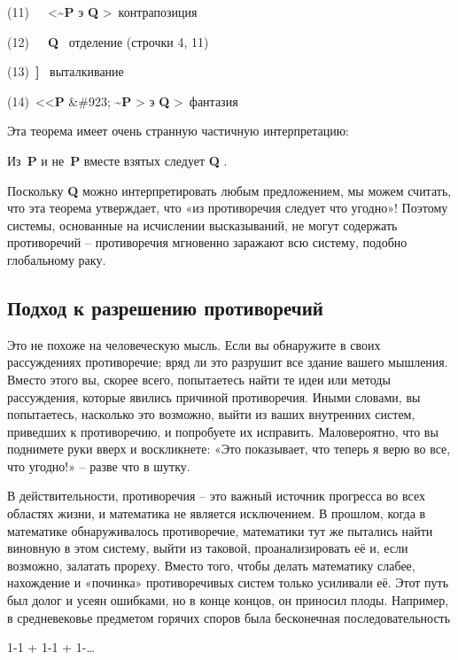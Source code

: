 \documentclass[../main.tex]{subfiles}
\begin{document}
(11)~~~\textless{}\textbf{\textasciitilde P} э \textbf{Q} \textgreater~контрапозиция

(12)~~~\textbf{Q} ~отделение (строчки 4, 11)

(13)~\textbf{{]}} ~выталкивание

(14)~\textless\textless{}\textbf{P} \&\#923; \textbf{\textasciitilde P} \textgreater{} э \textbf{Q} \textgreater~фантазия

Эта теорема имеет очень странную частичную интерпретацию:

Из~\textbf{P} и не~\textbf{P} вместе взятых следует \textbf{Q} .

Поскольку \textbf{Q} можно интерпретировать любым предложением, мы можем считать, что эта теорема утверждает, что «из противоречия следует что угодно»! Поэтому системы, основанные на исчислении высказываний, не могут содержать противоречий \--- противоречия мгновенно заражают всю систему, подобно глобальному раку.


\subsection{Подход к разрешению противоречий}

Это не похоже на человеческую мысль. Если вы обнаружите в своих рассуждениях противоречие; вряд ли это разрушит все здание вашего мышления. Вместо этого вы, скорее всего, попытаетесь найти те идеи или методы рассуждения, которые явились причиной противоречия. Иными словами, вы попытаетесь, насколько это возможно, выйти из ваших внутренних систем, приведших к противоречию, и попробуете их исправить. Маловероятно, что вы поднимете руки вверх и воскликнете: «Это показывает, что теперь я верю во все, что угодно!» \--- разве что в шутку.

В действительности, противоречия \--- это важный источник прогресса во всех областях жизни, и математика не является исключением. В прошлом, когда в математике обнаруживалось противоречие, математики тут же пытались найти виновную в этом систему, выйти из таковой, проанализировать её и, если возможно, залатать прореху. Вместо того, чтобы делать математику слабее, нахождение и «починка» противоречивых систем только усиливали её. Этот путь был долог и усеян ошибками, но в конце концов, он приносил плоды. Например, в средневековье предметом горячих споров была бесконечная последовательность

1-1 + 1-1 + 1-\ldots{}
\end{document}
